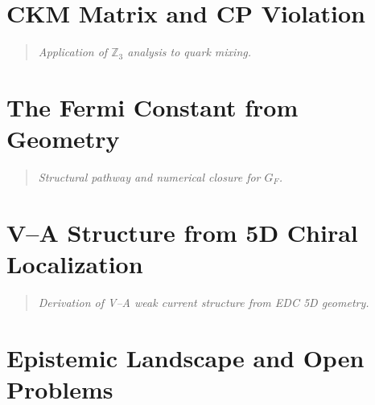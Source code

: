 \documentclass[11pt,a4paper]{book}
\theoremstyle{definition}
\theoremstyle{remark}
\begin{document}
\chapter{CKM Matrix and CP Violation}
\label{ch:ckm_cp}

\begin{quote}
\textit{Application of $\mathbb{Z}_3$ analysis to quark mixing.}
\end{quote}



\chapter{The Fermi Constant from Geometry}
\label{ch:gf_derivation}

\begin{quote}
\textit{Structural pathway and numerical closure for $G_F$.}
\end{quote}



\chapter{V--A Structure from 5D Chiral Localization}
\label{ch:va_structure}

\begin{quote}
\textit{Derivation of V--A weak current structure from EDC 5D geometry.}
\end{quote}



\chapter{Epistemic Landscape and Open Problems}
\label{ch:epistemic_map}
\end{document}
